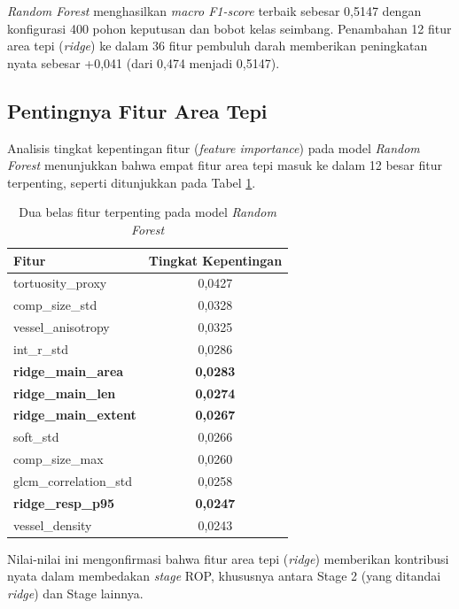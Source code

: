 \textit{Random Forest} menghasilkan \textit{macro F1-score} terbaik sebesar 0,5147 dengan
konfigurasi 400 pohon keputusan dan bobot kelas seimbang. Penambahan 12 fitur area tepi
(\textit{ridge}) ke dalam 36 fitur pembuluh darah memberikan peningkatan nyata sebesar +0,041
(dari 0,474 menjadi 0,5147).

\subsection{Pentingnya Fitur Area Tepi}

Analisis tingkat kepentingan fitur (\textit{feature importance}) pada model \textit{Random
Forest} menunjukkan bahwa empat fitur area tepi masuk ke dalam 12 besar fitur terpenting,
seperti ditunjukkan pada Tabel \ref{tab:feature_importance}.

\begin{table}[H]
\centering
\caption{Dua belas fitur terpenting pada model \textit{Random Forest}}
\label{tab:feature_importance}
\begin{tabular}{l c}
\toprule
\textbf{Fitur} & \textbf{Tingkat Kepentingan} \\
\midrule
tortuosity\_proxy         & 0,0427 \\
comp\_size\_std           & 0,0328 \\
vessel\_anisotropy        & 0,0325 \\
int\_r\_std               & 0,0286 \\
\textbf{ridge\_main\_area}     & \textbf{0,0283} \\
\textbf{ridge\_main\_len}      & \textbf{0,0274} \\
\textbf{ridge\_main\_extent}   & \textbf{0,0267} \\
soft\_std                 & 0,0266 \\
comp\_size\_max           & 0,0260 \\
glcm\_correlation\_std    & 0,0258 \\
\textbf{ridge\_resp\_p95}      & \textbf{0,0247} \\
vessel\_density           & 0,0243 \\
\bottomrule
\end{tabular}
\end{table}

\noindent Nilai-nilai ini mengonfirmasi bahwa fitur area tepi (\textit{ridge}) memberikan
kontribusi nyata dalam membedakan \textit{stage} ROP, khususnya antara Stage 2 (yang ditandai
\textit{ridge}) dan Stage lainnya.

